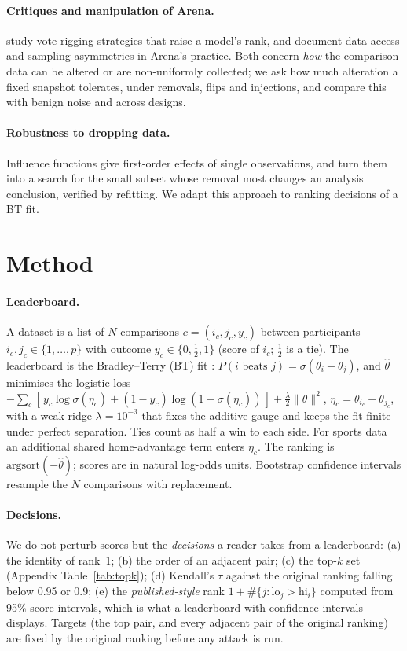 \documentclass{article}
\begin{document}
\paragraph{Critiques and manipulation of Arena.}
\citet{min2025rigging} study vote-rigging strategies that raise a model's rank, and
\citet{singh2025illusion} document data-access and sampling asymmetries in Arena's practice.
Both concern \emph{how} the comparison data can be altered or are non-uniformly collected; we ask how much
alteration a fixed snapshot tolerates, under removals, flips and injections, and compare this with benign noise
and across designs.
\paragraph{Robustness to dropping data.}
Influence functions \citep{koh2017influence} give first-order effects of single observations, and
\citet{broderick2020amip} turn them into a search for the small subset whose removal most changes an analysis conclusion,
verified by refitting. We adapt this approach to ranking decisions of a BT fit.

\section{Method}\label{sec:method}
\paragraph{Leaderboard.}
A dataset is a list of $N$ comparisons $c=(i_c,j_c,y_c)$ between participants $i_c,j_c\in\{1,\dots,p\}$ with outcome $y_c\in\{0,\tfrac12,1\}$ (score of $i_c$; $\tfrac12$ is a tie).
The leaderboard is the Bradley--Terry (BT) fit \citep{bradley1952}: $P(i\text{ beats }j)=\sigma(\theta_i-\theta_j)$, and
$\hat\theta$ minimises the logistic loss $-\sum_c [\,y_c\log\sigma(\eta_c)+(1-y_c)\log(1-\sigma(\eta_c))\,]+\tfrac{\lambda}{2}\|\theta\|^2$,
$\eta_c=\theta_{i_c}-\theta_{j_c}$, with a weak ridge $\lambda=10^{-3}$ that fixes the additive gauge and keeps the fit finite under perfect separation.
Ties count as half a win to each side. For sports data an additional shared home-advantage term enters $\eta_c$.
The ranking is $\mathrm{argsort}(-\hat\theta)$; scores are in natural log-odds units.
Bootstrap confidence intervals resample the $N$ comparisons with replacement.
\paragraph{Decisions.}
We do not perturb scores but the \emph{decisions} a reader takes from a leaderboard:
(a) the identity of rank~1; (b) the order of an adjacent pair; (c) the top-$k$ set (Appendix Table~\ref{tab:topk}); (d) Kendall's $\tau$ against the original ranking falling below 0.95 or 0.9;
(e) the \emph{published-style} rank $1+\#\{j:\mathrm{lo}_j>\mathrm{hi}_i\}$ computed from 95\% score intervals, which is what a leaderboard with confidence intervals displays.
Targets (the top pair, and every adjacent pair of the original ranking) are fixed by the original ranking before any attack is run.
\end{document}
